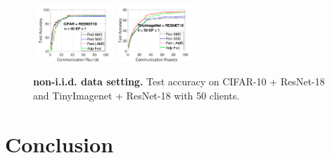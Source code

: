 \documentclass[nohyperref]{article}
\begin{document}
\begin{figure}[H]
    \begin{center}
        \mbox{
\includegraphics[width=0.25\textwidth]{new_fmnist_mnist_fig/cifar_testerror_resnet18_ep1_client2_iid0_reddi.pdf}
        \hspace{-0.1in}\includegraphics[width=0.25\textwidth]{new_fmnist_mnist_fig/tinyimagenet_testerror_resnet18_ep1_client2_iid0_reddi.pdf}\hspace{-0.1in}
        }
    \end{center}
	\caption{\textbf{non-i.i.d. data setting.} Test accuracy on CIFAR-10 + ResNet-18 and TinyImagenet + ResNet-18 with 50 clients.
	}
	\label{fig:noniidresnet18}\vspace{-0.1in}
\end{figure}

\begin{table}[h]
\centering
\caption{Test Accuracy on ResNet-18 Network.}\label{tab:acc}
	\vspace{-0.2in}
\end{table}



\section{Conclusion}\label{sec:conclusion}
\end{document}
